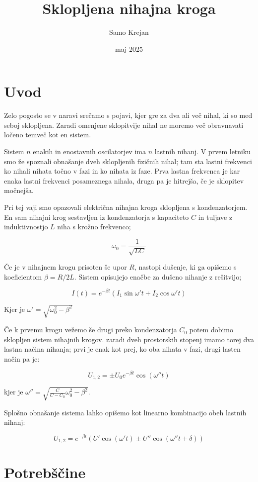 \documentclass[12pt]{article}
\title{\textbf{Sklopljena nihajna kroga}}
\author{Samo Krejan}
\date{maj 2025}
\begin{document}
\maketitle

\section{Uvod}

Zelo pogosto se v naravi srečamo s pojavi, kjer gre za dva ali več nihal, ki so med seboj sklopljena. Zaradi omenjene sklopitvije nihal ne moremo več obravnavati ločeno temveč kot en sistem.

Sistem $n$ enakih in enostavnih oscilatorjev ima $n$ lastnih nihanj. V prvem letniku smo že spoznali obnašanje dveh sklopljenih fizičnih nihal; tam sta lastni frekvenci ko nihali nihata točno v fazi in ko nihata iz faze. Prva lastna frekvenca je kar enaka lastni frekvenci posameznega nihala, druga pa je hitrejša, če je sklopitev močnejša.

Pri tej vaji smo opazovali električna nihajna kroga sklopljena s kondenzatorjem. En sam nihajni krog sestavljen iz kondenzatorja s kapaciteto $C$ in tuljave z induktivnostjo $L$ niha s krožno frekvenco; 

$$\omega_0 = \frac{1}{\sqrt{LC}}$$

Če je v nihajnem krogu prisoten še upor $R$, nastopi dušenje, ki ga opišemo s koeficientom $\beta = R/2L$. Sistem opisujejo enačbe za dušeno nihanje z rešitvijo;

$$I(t) = e^{-\beta t} \left(I_1\sin{\omega ' t} + I_2\cos{\omega ' t}\right)$$

Kjer je $\omega ' = \sqrt{\omega_0^2 - \beta^2}$

Če k prvemu krogu vežemo še drugi preko kondenzatorja $C_0$ potem dobimo sklopljen sistem nihajnih krogov. zaradi dveh prostorskih stopenj imamo torej dva lastna načina nihanja; prvi je enak kot prej, ko oba nihata v fazi, drugi lasten način pa je:

$$U_{1,2} = \pm U_0 e^{-\beta t} \cos (\omega '' t)$$

kjer je $\omega '' = \sqrt{\frac{C}{C-C_0}\omega_0^2 - \beta^2}$.

Splošno obnašanje sistema lahko opišemo kot linearno kombinacijo obeh lastnih nihanj:

$$U_{1,2} = e^{-\beta t} \left(U' \cos (\omega' t) \pm U'' \cos (\omega '' t + \delta)\right)$$



\section{Potrebščine}
\end{document}
